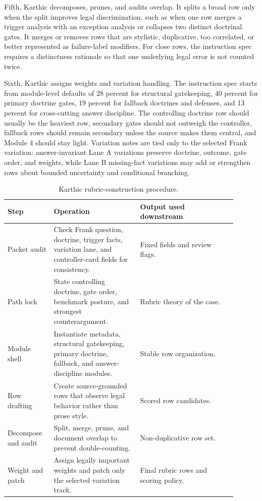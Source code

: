 Fifth, Karthic decomposes, prunes, and audits overlap. It splits a broad row
only when the split improves legal discrimination, such as when one row merges a
trigger analysis with an exception analysis or collapses two distinct doctrinal
gates. It merges or removes rows that are stylistic, duplicative, too
correlated, or better represented as failure-label modifiers. For close rows,
the instruction spec requires a distinctness rationale so that one underlying
legal error is not counted twice.

Sixth, Karthic assigns weights and variation handling. The instruction spec
starts from module-level defaults of 28 percent for structural gatekeeping, 40
percent for primary doctrine gates, 19 percent for fallback doctrines and
defenses, and 13 percent for cross-cutting answer discipline. The controlling
doctrine row should usually be the heaviest row, secondary gates should not
outweigh the controller, fallback rows should remain secondary unless the source
makes them central, and Module 4 should stay light. Variation notes are tied
only to the selected Frank variation: answer-invariant Lane A variations
preserve doctrine, outcome, gate order, and weights, while Lane B missing-fact
variations may add or strengthen rows about bounded uncertainty and conditional
branching.

\begin{table}[h]
\centering
\caption{Karthic rubric-construction procedure.}
\label{tab:karthic-procedure}
\begin{tabular}{p{0.18\linewidth}p{0.34\linewidth}p{0.38\linewidth}}
\toprule
Step & Operation & Output used downstream \\
\midrule
Packet audit & Check Frank question, doctrine, trigger facts, variation lane, and controller-card fields for consistency. & Fixed fields and review flags. \\
Path lock & State controlling doctrine, gate order, benchmark posture, and strongest counterargument. & Rubric theory of the case. \\
Module shell & Instantiate metadata, structural gatekeeping, primary doctrine, fallback, and answer-discipline modules. & Stable row organization. \\
Row drafting & Create source-grounded rows that observe legal behavior rather than prose style. & Scored row candidates. \\
Decompose and audit & Split, merge, prune, and document overlap to prevent double-counting. & Non-duplicative row set. \\
Weight and patch & Assign legally important weights and patch only the selected variation track. & Final rubric rows and scoring policy. \\
\bottomrule
\end{tabular}
\end{table}

